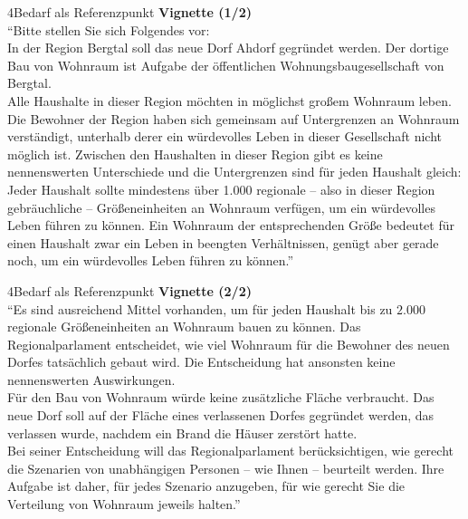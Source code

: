\documentclass[xcolor=table,9pt,aspectratio=169]{beamer}
\begin{document}
\begin{frame}{\vspace*{10mm}4\hspace*{1em}Bedarf als Referenzpunkt}
\textbf{Vignette (1/2)}\\
\medskip
\enquote{Bitte stellen Sie sich Folgendes vor:\\
\medskip
In der Region Bergtal soll das neue Dorf Ahdorf gegründet werden. Der dortige Bau von Wohnraum ist Aufgabe der öffentlichen Wohnungsbaugesellschaft von Bergtal.\\
\medskip
Alle Haushalte in dieser Region möchten in möglichst großem Wohnraum leben. Die Bewohner der Region haben sich gemeinsam auf Untergrenzen an Wohnraum verständigt, unterhalb derer ein würdevolles Leben in dieser Gesellschaft nicht möglich ist. Zwischen den Haushalten in dieser Region gibt es keine nennenswerten Unterschiede und die Untergrenzen sind für jeden Haushalt gleich: Jeder Haushalt sollte mindestens über 1.000 regionale -- also in dieser Region gebräuchliche -- Größeneinheiten an Wohnraum verfügen, um ein würdevolles Leben führen zu können. Ein Wohnraum der entsprechenden Größe bedeutet für einen Haushalt zwar ein Leben in beengten Verhältnissen, genügt aber gerade noch, um ein würdevolles Leben führen zu können.}
\end{frame}


\begin{frame}{\vspace*{10mm}4\hspace*{1em}Bedarf als Referenzpunkt}
\textbf{Vignette (2/2)}\\
\medskip
\enquote{Es sind ausreichend Mittel vorhanden, um für jeden Haushalt bis zu $2.000$ regionale Größeneinheiten an Wohnraum bauen zu können. Das Regionalparlament entscheidet, wie viel Wohnraum für die Bewohner des neuen Dorfes tatsächlich gebaut wird. Die Entscheidung hat ansonsten keine nennenswerten Auswirkungen.\\
\medskip
Für den Bau von Wohnraum würde keine zusätzliche Fläche verbraucht. Das neue Dorf soll auf der Fläche eines verlassenen Dorfes gegründet werden, das verlassen wurde, nachdem ein Brand die Häuser zerstört hatte.\\
\medskip
Bei seiner Entscheidung will das Regionalparlament berücksichtigen, wie gerecht die Szenarien von unabhängigen Personen -- wie Ihnen -- beurteilt werden. Ihre Aufgabe ist daher, für jedes Szenario anzugeben, für wie gerecht Sie die Verteilung von Wohnraum jeweils halten.}
\end{frame}
\end{document}
